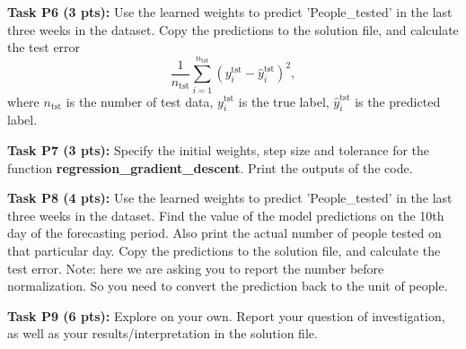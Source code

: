 \documentclass[12pt]{article}
\begin{document}
\textbf{Task P6 (3 pts):} Use the learned weights to predict 'People\_tested' in the last three weeks in the dataset. Copy the predictions to the solution file, and calculate the test error
$$\frac{1}{n_{\mathrm{tst}}}\sum_{i=1}^{n_{\mathrm{tst}}} (y_i^{\mathrm{tst}}-\hat{y}_i^{\mathrm{tst}})^2,$$
where $n_{\mathrm{tst}}$ is the number of test data, $y_i^{\mathrm{tst}}$ is the true label, $\hat{y}_i^{\mathrm{tst}}$ is the predicted label.

\textbf{Task P7 (3 pts):} Specify the initial weights, step size and tolerance for the function \textbf{regression\_gradient\_descent}. Print the outputs of the code.

\textbf{Task P8 (4 pts):} Use the learned weights to predict 'People\_tested' in the last three weeks in the dataset. Find the value of the model predictions on the 10th day of the forecasting period. Also print the actual number of people tested on that particular day. Copy the predictions to the solution file, and calculate the test error. Note: here we are asking you to report the number before normalization. So you need to convert the prediction back to the unit of people.

\textbf{Task P9 (6 pts):} Explore on your own. Report your question of investigation, as well as your results/interpretation in the solution file.
\end{document}
